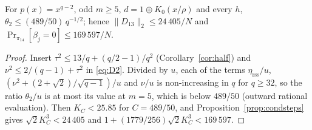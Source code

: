 \begin{corollary}[Inverse map with $d=1\oplus K_0(x/\rho)$: thirteen steps]\label{cor:inv13}
For $p(x)=x^{q-2}$, odd $m\ge5$, $d=1\oplus K_0(x/\rho)$ and every $h$, $\theta_2\le(489/50)\,q^{-1/2}$; hence
$\|D_{13}\|_2\le24\,405/N$ and $\Pr_{\pi_{14}}[\beta_j=0]\le169\,597/N$.
\end{corollary}
\begin{proof}
Insert $\tau^2\le13/q+(q/2-1)/q^2$ (Corollary~\ref{cor:half}) and $\nu^2\le2/(q-1)+\tau^2$ in \eqref{eq:D2}. Divided by $u$, each of the terms
$\eta_{\mathrm{rss}}/u$, $(\nu^2+(2+\sqrt2)/\sqrt{q-1})/u$ and $\nu/u$ is non-increasing in $q$ for $q\ge32$, so the ratio $\theta_2/u$ is at most its value at
$m=5$, which is below $489/50$ (outward rational evaluation). Then $K_C<25.85$ for $C=489/50$, and Proposition~\ref{prop:condsteps} gives
$\sqrt2K_C^3<24\,405$ and $1+(1779/256)\sqrt2K_C^3<169\,597$.
\end{proof}
